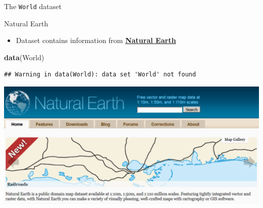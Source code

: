 \documentclass[
  ignorenonframetext,
]{beamer}
\newenvironment{Shaded}{\begin{snugshade}}{\end{snugshade}}
\newcommand{\KeywordTok}[1]{\textcolor[rgb]{0.13,0.29,0.53}{\textbf{#1}}}
\newcommand{\NormalTok}[1]{#1}
\providecommand{\tightlist}{%
  \setlength{\itemsep}{0pt}\setlength{\parskip}{0pt}}
\begin{document}
\begin{frame}[fragile]{The \texttt{World} dataset}
\protect\hypertarget{the-world-dataset}{}
\begin{block}{Natural Earth}
\protect\hypertarget{natural-earth}{}
\begin{itemize}
\tightlist
\item
  Dataset contains information from
  \href{http://www.naturalearthdata.com/}{\textbf{Natural Earth}}
\end{itemize}

\begin{Shaded}
\begin{Highlighting}[]
\KeywordTok{data}\NormalTok{(World)}
\end{Highlighting}
\end{Shaded}

\begin{verbatim}
## Warning in data(World): data set 'World' not found
\end{verbatim}

\includegraphics{pics/NaturalEarthData.PNG}
\end{block}
\end{frame}
\end{document}
